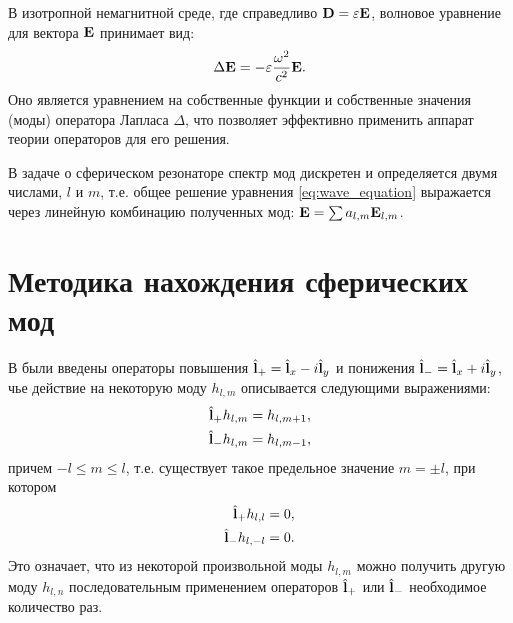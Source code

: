 \documentclass[12pt,a4paper]{article}
\begin{document}
        В изотропной немагнитной среде, где справедливо $\mathbf{D} = \varepsilon \mathbf{E}$, волновое уравнение для вектора $\mathbf{E}$ принимает вид:
        \begin{equation}\label{eq:wave_equation}
            \Delta \mathbf{E} = - \varepsilon \frac{\omega^2}{c^2} \mathbf{E} .
        \end{equation}
        Оно является уравнением на собственные функции и собственные значения (моды) оператора Лапласа $\Delta$, что позволяет эффективно применить аппарат теории операторов для его решения.

        В задаче о сферическом резонаторе спектр мод дискретен и определяется двумя числами, $l$ и $m$, т.е. общее решение уравнения \autoref{eq:wave_equation} выражается через линейную комбинацию полученных мод: $\mathbf{E} = \sum a_{l,m} \mathbf{E}_{l,m}$.


    \section{Методика нахождения сферических мод}

        В \cite{math_appendix} были введены операторы повышения $\hat{\mathbf{l}}_{+} = \hat{\mathbf{l}}_x - i \hat{\mathbf{l}}_y$ и понижения $\hat{\mathbf{l}}_{-} = \hat{\mathbf{l}}_x + i \hat{\mathbf{l}}_y$, чье действие на некоторую моду $h_{l, m}$ описывается следующими выражениями:
        \begin{equation}\begin{aligned}
            \hat{\mathbf{l}}_{+} h_{l, m} &= h_{l, m+1} , \\
            \hat{\mathbf{l}}_{-} h_{l, m} &= h_{l, m-1} ,
        \end{aligned}\end{equation}
        причем $- l \le m \le l$, т.е. существует такое предельное значение $m = \pm l$, при котором
        \begin{equation}\begin{aligned}
            \hat{\mathbf{l}}_{+} h_{l, l}   &= 0 , \\
            \hat{\mathbf{l}}_{-} h_{l, - l} &= 0 .
        \end{aligned}\end{equation}
        Это означает, что из некоторой произвольной моды $h_{l, m}$ можно получить другую моду $h_{l, n}$ последовательным применением операторов $\hat{\mathbf{l}}_{+}$ или $\hat{\mathbf{l}}_{-}$ необходимое количество раз.
\end{document}
